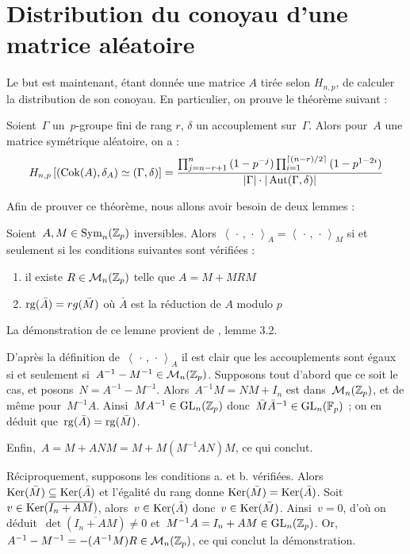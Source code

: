 \section{Distribution du conoyau d'une matrice aléatoire}

Le but est maintenant, étant donnée une matrice $A$ tirée selon $H_{n,p}$, de calculer la distribution de son conoyau.
En particulier, on prouve le théorème suivant :

\begin{thm}
Soient~$\Gamma$ un~$p$-groupe fini de rang $r$, $\delta$ un accouplement sur~$\Gamma$.
Alors pour~$A$ une matrice symétrique aléatoire, on a :
\[ H_{n,p}\left[(\operatorname{Cok}(A),\delta_A) \simeq (\Gamma,\delta)\right] = \frac{\prod_{j=n-r+1}^{n}{(1-p^{-j})}\prod_{i=1}^{\lceil (n-r)/2\rceil}{(1-p^{1-2i})}}{|\Gamma|\cdot|\operatorname{Aut}(\Gamma,\delta)|}\]
\end{thm} 

Afin de prouver ce théorème, nous allons avoir besoin de deux lemmes :

\begin{lem}
Soient~$A,M\in\operatorname{Sym}_n(\mathbb{Z}_p)$ inversibles. Alors~$\left<\,\cdot\,,\,\cdot\,\right>_{\!A} = \left<\,\cdot\,,\,\cdot\,\right>_{\!M}$ si et seulement si les conditions suivantes sont vérifiées :
\begin{enumerate}
\item il existe $R\in\mathcal M_n(\mathbb{Z}_p)$ telle que $A=M+MRM$
\item $\operatorname{rg}(\bar A) = rg(\bar M)$ où $\bar A$ est la réduction de $A$ modulo $p$
\end{enumerate}
\end{lem}

La démonstration de ce lemme provient de \cite{lemma}, lemme 3.2.
\begin{dem}
D'après la définition de~$\left<\,\cdot\,,\,\cdot\,\right>_{\!A}$ il est clair que les accouplements sont égaux si et seulement si~$A^{-1} - M^{-1} \in \mathcal{M}_n(\mathbb{Z}_p)$.
Supposons tout d'abord que ce soit le cas, et posons~$N = A^{-1} - M^{-1}$. Alors~$A^{-1}M = NM+I_n$ est dans~$\mathcal M_n(\mathbb{Z}_p)$, et de même pour~$M^{-1}A$. 
Ainsi~$MA^{-1}\in \operatorname{GL}_n(\mathbb{Z}_p)$ donc~$\bar M\bar A^{-1}\in \operatorname{GL}_n(\mathbb F_p)$ ; on en déduit que~$\operatorname{rg}(\bar A) = \operatorname{rg}(\bar M)$.

Enfin,~$A = M+ANM = M + M(M^{-1}AN)M$, ce qui conclut.

Réciproquement, supposons les conditions a. et b. vérifiées. Alors~$\operatorname{Ker}(\bar M) \subseteq \operatorname{Ker}(\bar A)$ et l'égalité du rang donne $\operatorname{Ker}(\bar M) = \operatorname{Ker}(\bar A)$.
Soit~$v\in\operatorname{Ker}(\overline{I_n+AM})$, alors~$v\in\operatorname{Ker}(\bar A)$ donc~$v\in\operatorname{Ker}(\bar M)$. Ainsi~$v = 0$, d'où on déduit~$\det(\overline{I_n+AM})\neq 0$ et~$M^{-1}A = I_n+AM \in\operatorname{GL}_n(\mathbb{Z}_p)$.
Or, $A^{-1}-M^{-1} = -(A^{-1}M)R \in\mathcal M_n(\mathbb{Z}_p)$,  ce qui conclut la démonstration.
\end{dem}

